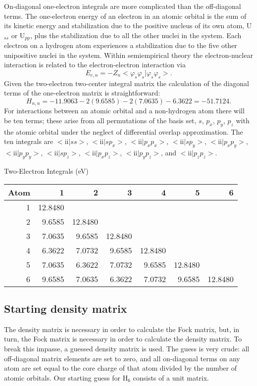 On-diagonal one-electron integrals are more complicated than the off-diagonal
terms. The one-electron energy of an electron in an atomic orbital is the sum
of its kinetic energy and stabilization due to the positive nucleus of its own
atom, U$_{ss}$ or U$_{pp}$, plus the stabilization due to all the other nuclei
in the system. Each electron on a hydrogen atom experiences a stabilization due
to the five other unipositive nuclei in the system. Within semiempirical theory
the electron-nuclear interaction is related to the electron-electron
interaction via
$$
E_{e,n}=-Z_n<\varphi_s\varphi_s|\varphi_s\varphi_s>.
$$
Given the two-electron two-center integral matrix the calculation of the
diagonal terms of the one-electron matrix is straightforward:
$$
 H_{n,n} = -11.9063 - 2(9.6585) - 2(7.0635) -6.3622 = -51.7124.
$$
For interactions between an atomic orbital and a non-hydrogen atom there will
be ten terms; these arise from all permutations of the basis set, $s$, $p_x$,
$p_y$, $p_z$ with the atomic orbital under the neglect of differential overlap
approximation. The ten integrals are $<$ii$|ss>$, $<$ii$|sp_x>$,
$<$ii$|p_xp_x>$, $<$ii$|sp_y>$, $<$ii$|p_xp_y>$,$ <$ii$|p_yp_y>$,
$<$ii$|sp_z>$, $<$ii$|p_xp_z>$, $<$ii$|p_yp_z>$, and $<$ii$|p_zp_z>$.

\begin{center}
Two-Electron Integrals (eV) \nopagebreak \\
\begin{tabular}{rrrrrrr} \hline
 Atom & 1 & 2 & 3 & 4 & 5 & 6 \\ \hline
 1 & 12.8480 \\
 2 & 9.6585& 12.8480 \\
 3 & 7.0635& 9.6585& 12.8480 \\
 4 & 6.3622& 7.0732& 9.6585& 12.8480 \\
 5 & 7.0635& 6.3622& 7.0732& 9.6585& 12.8480 \\
 6 & 9.6585& 7.0635& 6.3622& 7.0732& 9.6585& 12.8480 \\ \hline
\end{tabular}
\end{center}

\subsection{Starting density matrix}
The density matrix is necessary in order to calculate the Fock matrix, but, in
turn, the Fock matrix is necessary in order to calculate the density matrix. To
break this impasse, a guessed density matrix is used. The guess is very crude:
all off-diagonal matrix elements are set to zero, and all on-diagonal terms on
any atom are set equal to the core charge of that atom divided by the number of
atomic orbitals. Our starting guess for H$_6$ consists of a unit matrix.

